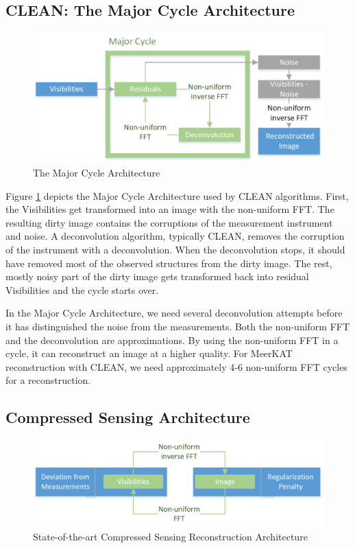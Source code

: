 \subsection{CLEAN: The Major Cycle Architecture}

\begin{figure}[h]
	\centering
	\includegraphics[width=0.80\linewidth]{./chapters/02.hypo/Major-Minor.png}
	\caption{The Major Cycle Architecture}
	\label{hypo:major}
\end{figure}

Figure \ref{hypo:major} depicts the Major Cycle Architecture used by CLEAN algorithms. First, the Visibilities get transformed into an image with the non-uniform FFT. The resulting dirty image contains the corruptions of the measurement instrument and noise. A deconvolution algorithm, typically CLEAN, removes the corruption of the instrument with a deconvolution. When the deconvolution stops, it should have removed most of the observed structures from the dirty image. The rest, mostly noisy part of the dirty image gets transformed back into residual Visibilities and the cycle starts over.

In the Major Cycle Architecture, we need several deconvolution attempts before it has distinguished the noise from the measurements. Both the non-uniform FFT and the deconvolution are approximations. By using the non-uniform FFT in a cycle, it can reconstruct an image at a higher quality. For MeerKAT reconstruction with CLEAN, we need approximately 4-6 non-uniform FFT cycles for a reconstruction.


\subsection{Compressed Sensing Architecture}\label{hypo:CSArch}

\begin{figure}[h]
	\centering
	\includegraphics[width=0.80\linewidth]{./chapters/02.hypo/CS2.png}
	\caption{State-of-the-art Compressed Sensing Reconstruction Architecture}
	\label{hypo:cs}
\end{figure}

